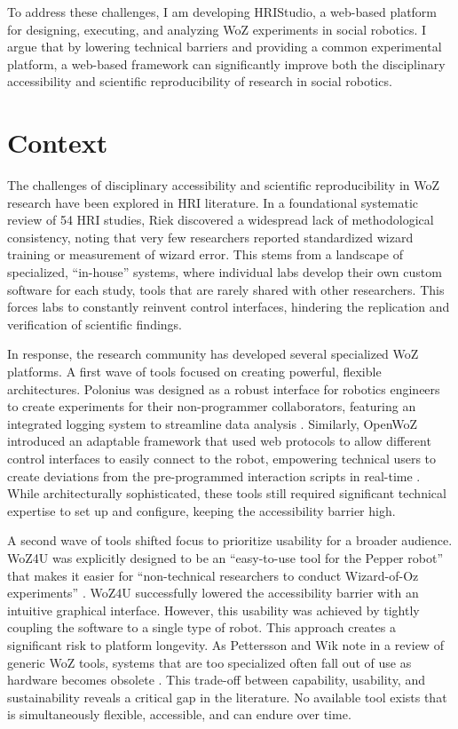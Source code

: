 \documentclass[numbib]{buthesis_p}  %
\begin{document}
To address these challenges, I am developing HRIStudio, a web-based platform for designing, executing, and analyzing WoZ experiments in social robotics. I argue that by lowering technical barriers and providing a common experimental platform, a web-based framework can significantly improve both the disciplinary accessibility and scientific reproducibility of research in social robotics.

\section{Context}

The challenges of disciplinary accessibility and scientific reproducibility in WoZ research have been explored in HRI literature. In a foundational systematic review of 54 HRI studies, Riek \cite{Riek2012} discovered a widespread lack of methodological consistency, noting that very few researchers reported standardized wizard training or measurement of wizard error. This stems from a landscape of specialized, ``in-house'' systems, where individual labs develop their own custom software for each study, tools that are rarely shared with other researchers. This forces labs to constantly reinvent control interfaces, hindering the replication and verification of scientific findings.

In response, the research community has developed several specialized WoZ platforms. A first wave of tools focused on creating powerful, flexible architectures. Polonius was designed as a robust interface for robotics engineers to create experiments for their non-programmer collaborators, featuring an integrated logging system to streamline data analysis \cite{Lu2011}. Similarly, OpenWoZ introduced an adaptable framework that used web protocols to allow different control interfaces to easily connect to the robot, empowering technical users to create deviations from the pre-programmed interaction scripts in real-time \cite{Hoffman2016}. While architecturally sophisticated, these tools still required significant technical expertise to set up and configure, keeping the accessibility barrier high.

A second wave of tools shifted focus to prioritize usability for a broader audience. WoZ4U was explicitly designed to be an ``easy-to-use tool for the Pepper robot'' that makes it easier for ``non-technical researchers to conduct Wizard-of-Oz experiments'' \cite{Rietz2021}. WoZ4U successfully lowered the accessibility barrier with an intuitive graphical interface. However, this usability was achieved by tightly coupling the software to a single type of robot. This approach creates a significant risk to platform longevity. As Pettersson and Wik note in a review of generic WoZ tools, systems that are too specialized often fall out of use as hardware becomes obsolete \cite{Pettersson2015}. This trade-off between capability, usability, and sustainability reveals a critical gap in the literature. No available tool exists that is simultaneously flexible, accessible, and can endure over time.
\end{document}

